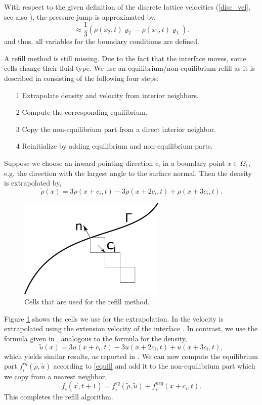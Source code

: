 \documentclass[final,leqno,onefignum,onetabnum]{siamltexmm}
\begin{document}
With respect to the given definition of the discrete lattice velocities (\ref{disc_vel}, see also \cite{Thoemmes2}), the pressure jump is approximated by,
\begin{equation}
	[p] \approx \frac{1}{3} (\rho(x_2,t)\varrho_2 - \rho(x_1,t)\varrho_1) \text{.}
\end{equation}
and thus, all variables for the boundary conditions are defined. 

A refill method is still missing. Due to the fact that the interface moves, some cells change their fluid type. We use an equilibrium/non-equilibrium refill as it is described in \cite{Caiazzo} consisting of the following four steps:
\begin{itemize}
	\item[1] Extrapolate density and velocity from interior neighbors.
	\item[2] Compute the corresponding equilibrium.
	\item[3] Copy the non-equilibrium part from a direct interior neighbor.
	\item[4] Reinitialize by adding equilibrium and non-equilibrium parts.
\end{itemize}
Suppose we choose an inward pointing direction $c_i$ in a boundary point $x \in \Omega_1$, e.g. the direction with the largest angle to the surface normal. Then the density is extrapolated by,
\begin{equation}
  \tilde{\rho}(x) = 3\rho(x+c_i,t) - 3\rho(x+2c_i,t) + \rho(x+3c_i,t).
\end{equation}
\begin{figure}[h]
	\hfill\includegraphics[trim = 0mm 0cm 0mm 2cm, clip,width=7cm,natwidth=445,natheight=305]{refillmethod.png}\hspace*{\fill}
	\caption{Cells that are used for the refill method.}
	\label{refill}
\end{figure}
Figure \ref{refill} shows the cells we use for the extrapolation. In \cite{Thoemmes} the velocity is extrapolated using the extension velocity of the interface \cite{Adalsteinsson}. In contrast, we use the formula given in \cite{Lallemand}, analogous to the formula for the density,
\begin{equation}
  \tilde{u}(x) = 3u(x+c_i,t) - 3u(x+2c_i,t) + u(x+3c_i,t),
\end{equation}
which yields similar results, as reported in \cite{Lallemand}.
We can now compute the equilibrium part $f_i^{eq}(\tilde{\rho},\tilde{u})$ according to \cref{equil} and add it to the non-equilibrium part which we copy from a nearest neighbor,
$$f_i(\vec{x},t+1) = f_i^{eq}(\tilde{\rho},\tilde{u}) + f_i^{neq}(x+c_i,t) \text{.}$$
This completes the refill algorithm.
\end{document}
